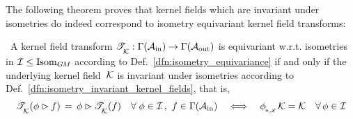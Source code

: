 The following theorem proves that kernel fields which are invariant under isometries do indeed correspond to isometry equivariant kernel field transforms:
\begin{thm}
\label{thm:isometry_equivariant_kernel_field_trafos}
    \ A kernel field transform $\mathscr{T}_{\overset{}{\mkern-0mu \mathcal{K}}}: \Gamma(\mathcal{A}_\textup{in})\to \Gamma(\mathcal{A}_\textup{out})$ is equivariant w.r.t. isometries in $\mathcal{I} \leq \operatorname{Isom}_{G\mkern-1.4muM}$ according to Def.~\ref{dfn:isometry_equivariance} if and only if
    the underlying kernel field~$\mathcal{K}$ is invariant under isometries according to Def.~\ref{dfn:isometry_invariant_kernel_fields}, that is,
    \begin{align}
        \TK(\phi \rhd f) \,=\, \phi \rhd \TK(f)
        \quad\forall\; \phi \in \I\,,\ f\in\Gamma(\Ain)
        \quad \Longleftrightarrow \quad
        \dphiK \K = \K
        \quad\forall\, \phi \in \I
    \end{align}
\end{thm}
